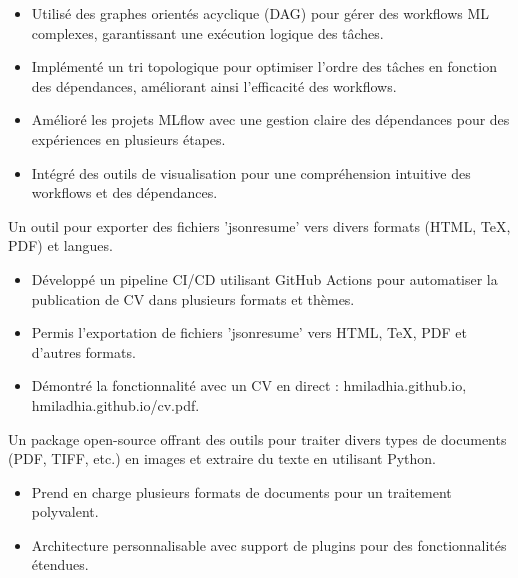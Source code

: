 \documentclass[10pt,letter,ragged2e,withhyper]{altacv}
\renewcommand{\divider}{\textcolor{body!30}{\hdashrule{\linewidth}{0.6pt}{0.5ex}}\medskip}
\begin{document}
\begin{paracol}{2}
\begin{itemize}
      \item Utilisé des graphes orientés acyclique (DAG) pour gérer des workflows ML complexes, garantissant une exécution logique des tâches.
      \item Implémenté un tri topologique pour optimiser l'ordre des tâches en fonction des dépendances, améliorant ainsi l'efficacité des workflows.
      \item Amélioré les projets MLflow avec une gestion claire des dépendances pour des expériences en plusieurs étapes.
      \item Intégré des outils de visualisation pour une compréhension intuitive des workflows et des dépendances.
  \end{itemize}

\divider
{}

Un outil pour exporter des fichiers 'jsonresume' vers divers formats (HTML, TeX, PDF) et langues.

\begin{itemize}
      \item Développé un pipeline CI/CD utilisant GitHub Actions pour automatiser la publication de CV dans plusieurs formats et thèmes.
      \item Permis l'exportation de fichiers 'jsonresume' vers HTML, TeX, PDF et d'autres formats.
      \item Démontré la fonctionnalité avec un CV en direct : hmiladhia.github.io, hmiladhia.github.io/cv.pdf.
  \end{itemize}

\divider
{}

Un package open-source offrant des outils pour traiter divers types de documents (PDF, TIFF, etc.) en images et extraire du texte en utilisant Python.

\begin{itemize}
      \item Prend en charge plusieurs formats de documents pour un traitement polyvalent.
      \item Architecture personnalisable avec support de plugins pour des fonctionnalités étendues.
  \end{itemize}


\end{paracol}
\end{document}
